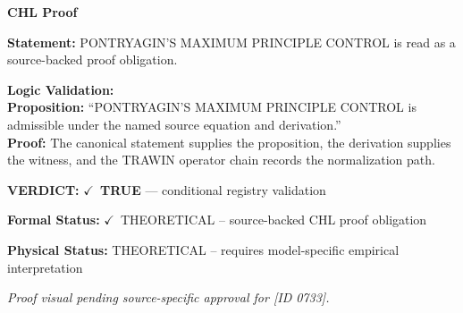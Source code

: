 \vspace{0.45em}
\noindent\textbf{CHL Proof}\par
\textbf{Statement:} PONTRYAGIN'S MAXIMUM PRINCIPLE CONTROL is read as a source-backed proof obligation.

\textbf{Logic Validation:}\\
\textbf{Proposition:} ``PONTRYAGIN'S MAXIMUM PRINCIPLE CONTROL is admissible under the named source equation and derivation.''\\
\textbf{Proof:} The canonical statement supplies the proposition, the derivation supplies the witness, and the TRAWIN operator chain records the normalization path.

\textbf{VERDICT:} \ensuremath{\checkmark}\ \textbf{TRUE} --- conditional registry validation

\textbf{Formal Status:} \ensuremath{\checkmark}\ THEORETICAL -- source-backed CHL proof obligation

\textbf{Physical Status:} THEORETICAL -- requires model-specific empirical interpretation
\par\vspace{0.45em}
\par
\vfill
\begingroup\footnotesize\itshape
Proof visual pending source-specific approval for [ID 0733].
\par\endgroup
\vfill
\endgroup
\endgroup

